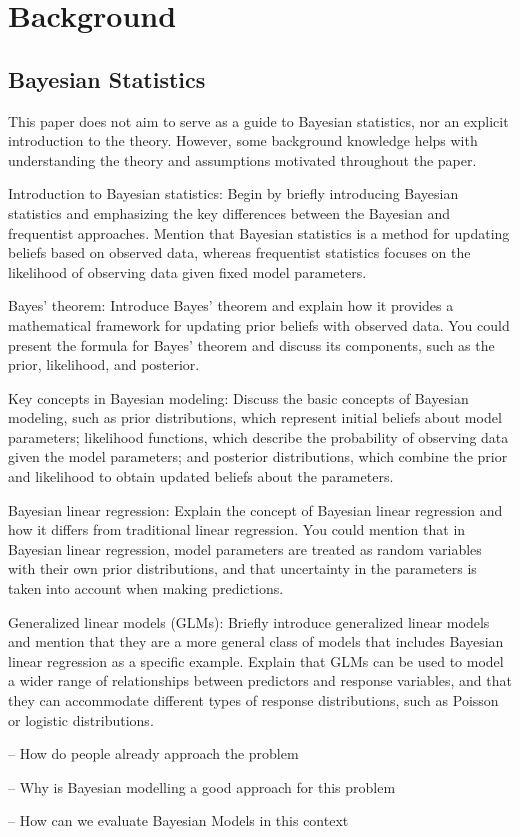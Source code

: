 \section{Background}


\subsection{Bayesian Statistics}

This paper does not aim to serve as a guide to Bayesian statistics, nor an
explicit introduction to the theory. However, some background knowledge helps
with understanding the theory and assumptions motivated throughout the paper.


Introduction to Bayesian statistics: Begin by briefly introducing Bayesian statistics and emphasizing the key differences between the Bayesian and frequentist approaches. Mention that Bayesian statistics is a method for updating beliefs based on observed data, whereas frequentist statistics focuses on the likelihood of observing data given fixed model parameters.

Bayes' theorem: Introduce Bayes' theorem and explain how it provides a mathematical framework for updating prior beliefs with observed data. You could present the formula for Bayes' theorem and discuss its components, such as the prior, likelihood, and posterior.

Key concepts in Bayesian modeling: Discuss the basic concepts of Bayesian modeling, such as prior distributions, which represent initial beliefs about model parameters; likelihood functions, which describe the probability of observing data given the model parameters; and posterior distributions, which combine the prior and likelihood to obtain updated beliefs about the parameters.

Bayesian linear regression: Explain the concept of Bayesian linear regression and how it differs from traditional linear regression. You could mention that in Bayesian linear regression, model parameters are treated as random variables with their own prior distributions, and that uncertainty in the parameters is taken into account when making predictions.

Generalized linear models (GLMs): Briefly introduce generalized linear models and mention that they are a more general class of models that includes Bayesian linear regression as a specific example. Explain that GLMs can be used to model a wider range of relationships between predictors and response variables, and that they can accommodate different types of response distributions, such as Poisson or logistic distributions.



-- How do people already approach the problem 

-- Why is Bayesian modelling a good approach for this problem 

-- How can we evaluate Bayesian Models in this context


